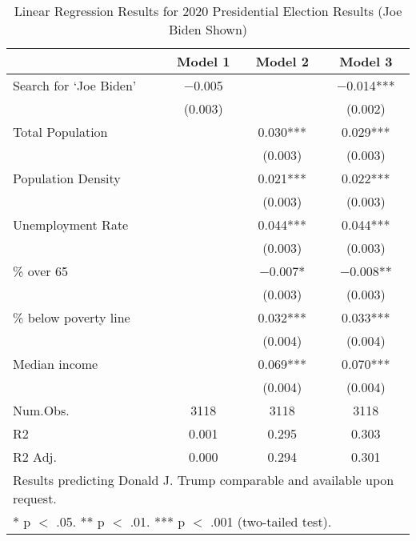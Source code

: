\begin{table}[!h]

\caption{\label{tab:pres_2020_analysis}Linear Regression Results for 2020 Presidential Election Results (Joe Biden Shown)}
\centering
\fontsize{8}{10}\selectfont

\begin{tabular}{lccc}
\toprule
  & Model 1 & Model 2 & Model 3\\
\midrule

Search for `Joe Biden' & \num{-0.005} &  & \num{-0.014}***\\
 & (\num{0.003}) &  & (\num{0.002})\\
Total Population &  & \num{0.030}*** & \num{0.029}***\\
 &  & (\num{0.003}) & \vphantom{3} (\num{0.003})\\
Population Density &  & \num{0.021}*** & \num{0.022}***\\
 &  & (\num{0.003}) & \vphantom{2} (\num{0.003})\\
Unemployment Rate &  & \num{0.044}*** & \num{0.044}***\\
 &  & (\num{0.003}) & \vphantom{1} (\num{0.003})\\
\% over 65 &  & \num{-0.007}* & \num{-0.008}**\\
 &  & (\num{0.003}) & (\num{0.003})\\
\% below poverty line &  & \num{0.032}*** & \num{0.033}***\\
 &  & (\num{0.004}) & \vphantom{1} (\num{0.004})\\
Median income &  & \num{0.069}*** & \num{0.070}***\\
 &  & (\num{0.004}) & (\num{0.004})\\
\midrule
Num.Obs. & \num{3118} & \num{3118} & \num{3118}\\
R2 & \num{0.001} & \num{0.295} & \num{0.303}\\
R2 Adj. & \num{0.000} & \num{0.294} & \num{0.301}\\
\bottomrule
\multicolumn{4}{l}{\rule{0pt}{1em}Results predicting Donald J. Trump comparable and available upon request.}\\
\multicolumn{4}{l}{\rule{0pt}{1em}* p $<$ .05. ** p $<$ .01. *** p $<$ .001 (two-tailed test).}\\
\end{tabular}
\end{table}